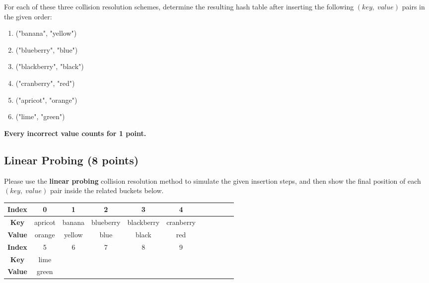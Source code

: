 \documentclass[11pt]{exam}
\begin{document}
For each of these three collision resolution schemes, determine the resulting hash table after inserting the following $(key,\;value)$ pairs in the given order:
\begin{enumerate}[1.]
\item ("banana", "yellow")
\item ("blueberry", "blue")
\item ("blackberry", "black")
\item ("cranberry", "red")
\item ("apricot", "orange")
\item ("lime", "green")
\end{enumerate}

\textbf{Every incorrect value counts for 1 point.}
\subsection{Linear Probing (8 points)}
Please use the \textbf{linear probing} collision resolution method to simulate the given insertion steps, and then show the final position of each $(key,\;value)$ pair inside the related buckets below.
\begin{solution}
\begin{table}[H]
\centering
\renewcommand{\arraystretch}{2}
\setlength{\tabcolsep}{5mm}
\begin{tabular}{|c|c|c|c|c|c|c|c|c|c|c|}
\hline
\textbf{Index}&0&1&2&3&4\\
\hline
\textbf{Key}&apricot&banana&blueberry&blackberry&cranberry\\
\hline
\textbf{Value}&orange&yellow&blue&black&red\\
\hline
\textbf{Index}&5&6&7&8&9\\
\hline
\textbf{Key}&lime&&&&\\
\hline
\textbf{Value}&green&&&&\\
\hline
\end{tabular}
\end{table}
\end{solution}
\end{document}
